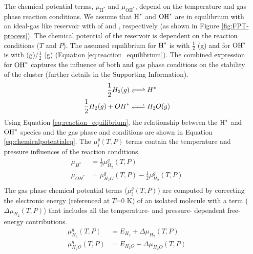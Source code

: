 \documentclass[journal=jctcce,manuscript=article]{achemso}
\begin{document}
The chemical potential terms,  $\mu_{\text{H}^{*}}$ and $\mu_{\text{OH}^{*}}$, depend on the temperature and gas phase reaction conditions. We assume that $\ce{\text{H}^{*}}$ and $\ce{\text{OH}^{*}}$ are in equilibrium with an ideal-gas like reservoir with of  and , respectively (as shown in Figure \ref{fig:FPT-process}). The chemical potential of the reservoir is dependent on the reaction conditions ($T$ and $P$). The assumed equilibrium for $\ce{\text{H}^{*}}$ is with $\frac{1}{2}$  (g) and for $\ce{\text{OH}^{*}}$ is with  (g)/$\frac{1}{2}$ (g) (Equation \ref{eq:reaction_equilibrium}). The combined expression for $\ce{OH^{*}}$ captures the influence of both  and  gas phase conditions on the stability of the cluster (further details in the Supporting Information).
\begin{equation}
    \begin{split}
        \frac{1}{2} H_{2} (g) & \ce{<=>} H^{*} \\           
        \frac{1}{2} H_{2} (g) + OH^{*} & \ce{<=>} H_{2}O (g)  
    \end{split}
    \label{eq:reaction_equilibrium}
\end{equation}
Using Equation \ref{eq:reaction_equilibrium}, the relationship between the $\ce{\text{H}^{*}}$ and $\ce{OH^{*}}$ species and the gas phase  and  conditions are shown in Equation \ref{eq:chemicalpotentialeq}. The $\mu_{i}^{g}(T,P)$ terms contain the temperature and pressure influences of the reaction conditions. 
\begin{equation}
    \begin{split}
        \mu_{H^{*}} &= \frac{1}{2} \mu_{H_{2}}^{g}(T,P) \\ 
        \mu_{OH^{*}} &= \mu_{H_{2}O}^{g}(T,P) - \frac{1}{2} \mu_{H_{2}}^{g}(T,P) \\
    \end{split}
    \label{eq:chemicalpotentialeq}
\end{equation}
 The gas phase chemical potential terms ($\mu_{i}^{g}(T,P)$) are computed by correcting the electronic energy (referenced at $T$=0 K) of an isolated molecule with a term ($\Delta \mu_{H_{2}}(T,P)$) that includes all the temperature- and pressure- dependent free-energy contributions. 
\begin{equation}
    \begin{split}
        \mu_{H_{2}}^{g}(T,P) &= E_{H_2} + \Delta \mu_{H_{2}}(T,P)  \\  
        \mu_{H_{2}O}^{g}(T,P) &= E_{H_{2}O} + \Delta \mu_{H_{2}O}(T,P) 
    \end{split}
    \label{eq:chemicalpotentialrel}
\end{equation}
\end{document}
